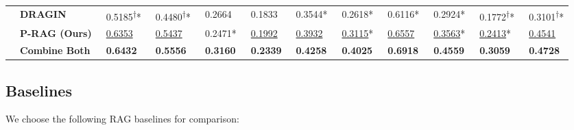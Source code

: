 \documentclass[sigconf,natbib=true,anonymous=false]{acmart}
\begin{document}
\begin{table}[t]
\begin{tabular}{|cl|c|c|c|c|c|c|c|c|c|c|}
& \textbf{DRAGIN}
& \multicolumn{1}{l|}{~0.5185\textsuperscript{\tiny $\dagger$}*}& \multicolumn{1}{l|}{~0.4480\textsuperscript{\tiny $\dagger$}*}& \multicolumn{1}{l|}{~0.2664}& \multicolumn{1}{l|}{~0.1833}& \multicolumn{1}{l|}{~0.3544*}& \multicolumn{1}{l|}{~0.2618*}& \multicolumn{1}{l|}{~0.6116*}& \multicolumn{1}{l|}{~0.2924*}& \multicolumn{1}{l|}{~0.1772\textsuperscript{\tiny $\dagger$}*}& \multicolumn{1}{l|}{~0.3101\textsuperscript{\tiny $\dagger$}*}\\

& \textbf{P-RAG  (Ours)}
& \multicolumn{1}{l|}{~\underline{0.6353}}& \multicolumn{1}{l|}{~\underline{0.5437}}& \multicolumn{1}{l|}{~0.2471*}& \multicolumn{1}{l|}{~\underline{0.1992}}& \multicolumn{1}{l|}{~\underline{0.3932}}& \multicolumn{1}{l|}{~\underline{0.3115}*}& \multicolumn{1}{l|}{~\underline{0.6557}}& \multicolumn{1}{l|}{~\underline{0.3563}*}& \multicolumn{1}{l|}{~\underline{0.2413}*}& \multicolumn{1}{l|}{~\underline{0.4541}}\\

& \textbf{Combine Both}
& \multicolumn{1}{l|}{~\textbf{0.6432}}& \multicolumn{1}{l|}{~\textbf{0.5556}}& \multicolumn{1}{l|}{~\textbf{0.3160}}& \multicolumn{1}{l|}{~\textbf{0.2339}}& \multicolumn{1}{l|}{~\textbf{0.4258}}& \multicolumn{1}{l|}{~\textbf{0.4025}}& \multicolumn{1}{l|}{~\textbf{0.6918}}& \multicolumn{1}{l|}{~\textbf{0.4559}}& \multicolumn{1}{l|}{~\textbf{0.3059}}& \multicolumn{1}{l|}{~\textbf{0.4728}}\\

\bottomrule
\end{tabular}

\end{table}








\subsection{Baselines}
\label{sec:baselines}

We choose the following RAG baselines for comparison: 
\end{document}
